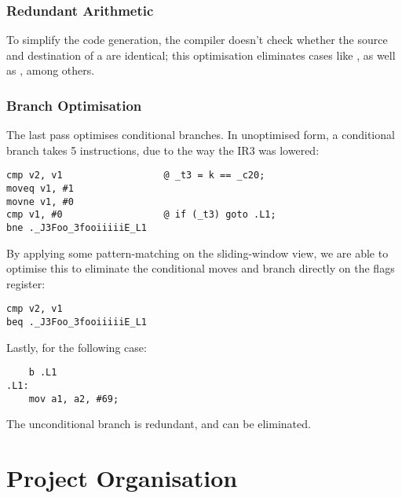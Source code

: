 \documentclass[12pt]{article}
\begin{document}


\subsubsection{Redundant Arithmetic}

To simplify the code generation, the compiler doesn't check whether the source and destination of a  are identical;
this optimisation eliminates cases like , as well as , among others.




\subsubsection{Branch Optimisation}

The last pass optimises conditional branches. In unoptimised form, a conditional branch takes 5 instructions, due to the
way the IR3 was lowered:

\begin{verbatim}
cmp v2, v1                  @ _t3 = k == _c20;
moveq v1, #1
movne v1, #0
cmp v1, #0                  @ if (_t3) goto .L1;
bne ._J3Foo_3fooiiiiiE_L1
\end{verbatim}

By applying some pattern-matching on the sliding-window view, we are able to optimise this to eliminate the conditional
moves and branch directly on the flags register:

\begin{verbatim}
cmp v2, v1
beq ._J3Foo_3fooiiiiiE_L1
\end{verbatim}


Lastly, for the following case:

\begin{verbatim}
	b .L1
.L1:
	mov a1, a2, #69;
\end{verbatim}

The unconditional branch is redundant, and can be eliminated.




\section{Project Organisation}
\end{document}
